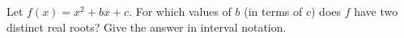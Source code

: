 Let $f(x)=x^2+bx+c$. For which values of $b$ (in terms of $c$) does $f$ have two distinct real roots? Give the answer in interval notation.
